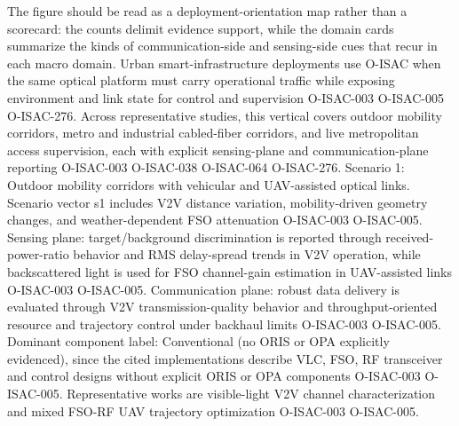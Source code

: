 {}\markdownRendererParagraphSeparator
{}The figure should be read as a deployment-orientation map rather than a scorecard: the counts delimit evidence support, while the domain cards summarize the kinds of communication-side and sensing-side cues that recur in each macro domain.\markdownRendererInterblockSeparator
{}\markdownRendererSectionBegin
\markdownRendererSectionBegin
{}\markdownRendererInterblockSeparator
{}\markdownRendererSectionBegin
{}\markdownRendererInterblockSeparator
{}Urban smart-infrastructure deployments use O-ISAC when the same optical platform must carry operational traffic while exposing environment and link state for control and supervision O-ISAC-003 O-ISAC-005 O-ISAC-276. Across representative studies, this vertical covers outdoor mobility corridors, metro and industrial cabled-fiber corridors, and live metropolitan access supervision, each with explicit sensing-plane and communication-plane reporting O-ISAC-003 O-ISAC-038 O-ISAC-064 O-ISAC-276.\markdownRendererInterblockSeparator
{}
\markdownRendererSectionEnd \markdownRendererSectionBegin
{}\markdownRendererInterblockSeparator
{}Scenario 1: Outdoor mobility corridors with vehicular and UAV-assisted optical links.\markdownRendererHardLineBreak
{}Scenario vector s1 includes V2V distance variation, mobility-driven geometry changes, and weather-dependent FSO attenuation O-ISAC-003 O-ISAC-005. Sensing plane: target/background discrimination is reported through received-power-ratio behavior and RMS delay-spread trends in V2V operation, while backscattered light is used for FSO channel-gain estimation in UAV-assisted links O-ISAC-003 O-ISAC-005. Communication plane: robust data delivery is evaluated through V2V transmission-quality behavior and throughput-oriented resource and trajectory control under backhaul limits O-ISAC-003 O-ISAC-005. Dominant component label: Conventional (no ORIS or OPA explicitly evidenced), since the cited implementations describe VLC, FSO, RF transceiver and control designs without explicit ORIS or OPA components O-ISAC-003 O-ISAC-005. Representative works are visible-light V2V channel characterization and mixed FSO-RF UAV trajectory optimization O-ISAC-003 O-ISAC-005.\markdownRendererParagraphSeparator
